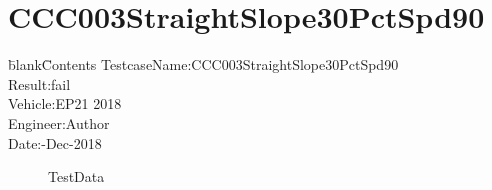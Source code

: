 \documentclass[12pt]{report}
\begin{document}
\section{CCC003StraightSlope30PctSpd90} 
\begin{CJK}{GBK}{kai} 
\begin{tabbing} 
\hspace*{40bp}\=blank\hspace*{80bp}\=Contents\kill 
 \>TestcaseName:\>CCC003StraightSlope30PctSpd90\\ 
 \>Result:\>fail\\ 
 \>Vehicle:\>EP21 2018\\ 
 \>Engineer:\>Author\\ 
 \>Date:-Dec-2018\\ 
\end{tabbing} 
\end{CJK} 
\label{w3} 
\begin{figure}[h!]  
\centering  
{} 
 
\caption{TestData} 
\end{figure} 
\newpage 
\end{document}

